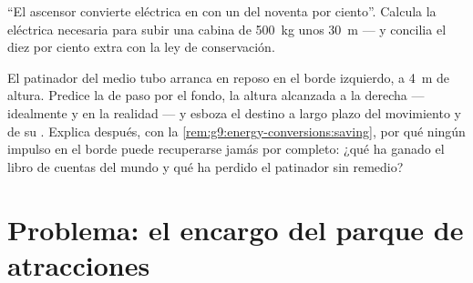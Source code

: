 \begin{exercise}[$\star\star$]\label{exo:g9:energy-conversions:11}
``El ascensor convierte  eléctrica en  con un  del noventa por ciento''. Calcula la
 eléctrica necesaria para subir una cabina de \qty{500}{kg}
unos \qty{30}{m} --- y concilia el diez por ciento extra con la ley de
conservación.
\end{exercise}

\begin{exercise}[$\star\star\star$]\label{exo:g9:energy-conversions:12}
El patinador del medio tubo arranca en reposo en el borde izquierdo, a
\qty{4}{m} de altura. Predice la  de paso por el fondo, la
altura alcanzada a la derecha --- idealmente y en la realidad --- y
esboza el destino a largo plazo del movimiento y de su
. Explica después, con la
\cref{rem:g9:energy-conversions:saving}, por qué ningún impulso en el
borde puede recuperarse jamás por completo: ¿qué ha ganado el libro de
cuentas del mundo y qué ha perdido el patinador sin remedio?
\end{exercise}

\section{Problema: el encargo del parque de atracciones}

